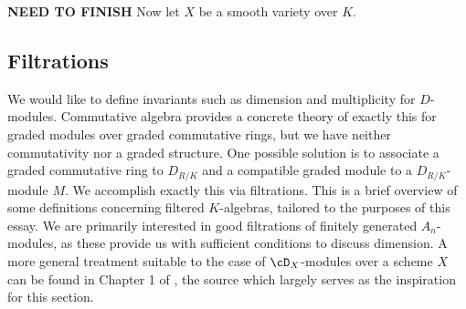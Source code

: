 \textbf{NEED TO FINISH}
Now let $X$ be a smooth variety over $K$.

\subsection{Filtrations}

We would like to define invariants such as dimension and multiplicity for $D$-modules. Commutative algebra provides a concrete theory of exactly this for graded modules over graded commutative rings, but we have neither commutativity nor a graded structure. One possible solution is to associate a graded commutative ring to $D_{R/K}$ and a compatible graded module to a $D_{R/K}$-module $M$. We accomplish exactly this via filtrations. This is a brief overview of some definitions concerning filtered $K$-algebras, tailored to the purposes of this essay. We are primarily interested in good filtrations of finitely generated $A_n$-modules, as these provide us with sufficient conditions to discuss dimension. A more general treatment suitable to the case of $\cD_X$-modules over a scheme $X$ can be found in Chapter 1 of \cite{ginzburg_d-mod}, the source which largely serves as the inspiration for this section.

